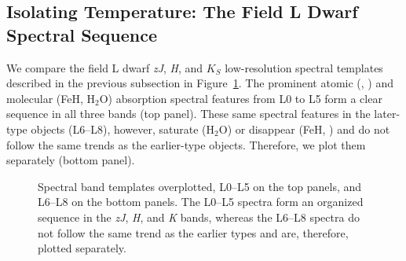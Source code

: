 \documentclass[modern]{aastex61}
\begin{document}
\clearpage



\subsection{Isolating Temperature: The Field L Dwarf Spectral Sequence}
\label{sec:temp}
We compare the field L dwarf \emph{zJ}, \emph{H}, and $K_S$ low-resolution spectral templates described in the previous subsection in Figure~\ref{fig:spec_sequence}.
The prominent atomic (, ) and molecular (FeH, H$_2$O) absorption spectral features from L0 to L5 form a clear sequence in all three bands (top panel).
These same spectral features in the later-type objects (L6--L8), however, saturate (H$_2$O) or disappear (FeH, ) and do not follow the same trends as the earlier-type objects. Therefore, we plot them separately (bottom panel).


\begin{figure}
    \caption{Spectral band templates overplotted, L0--L5 on the top panels, and L6--L8 on the bottom panels.
    The L0--L5 spectra form an organized sequence in the \emph{zJ}, \emph{H}, and \emph{K} bands, whereas the L6--L8 spectra do not follow the same trend as the earlier types and are, therefore, plotted separately.}
    \label{fig:spec_sequence}
\end{figure}
\end{document}
